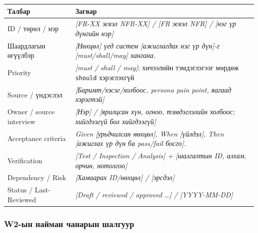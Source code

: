 \begin{longtable}[]{@{}
  >{\raggedright\arraybackslash}p{}
  >{\raggedright\arraybackslash}p{}@{}}
\toprule\noalign{}
\begin{minipage}[b]{\linewidth}\raggedright
Талбар
\end{minipage} & \begin{minipage}[b]{\linewidth}\raggedright
Загвар
\end{minipage} \\
\midrule\noalign{}
\endhead
\bottomrule\noalign{}
\endlastfoot
ID / төрөл / нэр & \emph{{[}FR-XX эсвэл NFR-XX{]} / {[}FR эсвэл NFR{]} /
{[}нэг үр дүнгийн нэр{]}} \\
Шаардлагын өгүүлбэр & \emph{{[}Нөхцөл{]} үед систем {[}ажиглагдах нэг үр
дүн{]}-г {[}must/shall/may{]} хангана.} \\
Priority & \emph{{[}must / shall / may{]}}; хичээлийн тэмдэглэгээг
мөрдөж \nolinkurl{should} хэрэглэхгүй \\
Source / үндэслэл & \emph{{[}Баримт/хэсэг/холбоос, persona pain point,
яагаад хэрэгтэй{]}} \\
Owner / source interview & \emph{{[}Нэр{]} / {[}ярилцсан хүн, огноо,
тэмдэглэлийн холбоос; хийгдээгүй бол хийгдээгүй{]}} \\
Acceptance criteria & \emph{Given {[}урьдчилсан нөхцөл{]}, When
{[}үйлдэл{]}, Then {[}ажиглах үр дүн ба pass/fail босго{]}.} \\
Verification & \emph{{[}Test / Inspection / Analysis{]} + {[}шалгалтын
ID, алхам, орчин, нотолгоо{]}} \\
Dependency / Risk & \emph{{[}Хамаарах ID/нөхцөл{]} / {[}эрсдэл{]}} \\
Status / Last-Reviewed & \emph{{[}Draft / reviewed / approved \ldots{]}
/ {[}YYYY-MM-DD{]}} \\
\end{longtable}

\subsubsection{W2-ын найман чанарын
шалгуур}\label{doc3-w2-ux44bux43d-ux43dux430ux439ux43cux430ux43d-ux447ux430ux43dux430ux440ux44bux43d-ux448ux430ux43bux433ux443ux443ux440}

